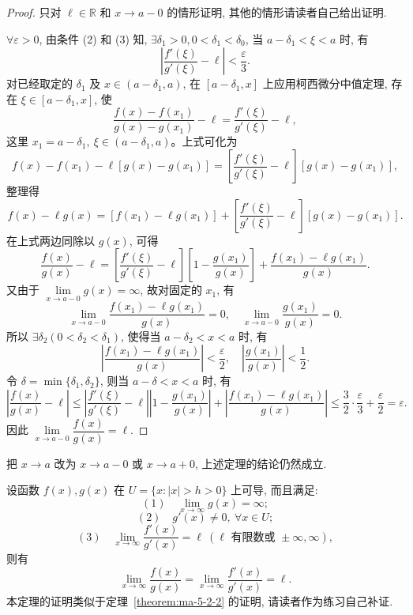\begin{proof}
只对 $\ell\in\mathbb{R}$ 和 $x\to a-0$ 的情形证明, 其他的情形请读者自己给出证明.

$\forall\varepsilon>0$, 由条件 (2) 和 (3) 知, $\exists\delta_1>0,0<\delta_1<\delta_0$, 当 $a-\delta_1<\xi<a$ 时, 有
\[
  \left|\frac{f'(\xi)}{g'(\xi)}-\ell\right|<\frac\varepsilon3.
\]
对已经取定的 $\delta_1$ 及 $x\in(a-\delta_1,a)$, 在 $[a-\delta_1,x]$ 上应用柯西微分中值定理, 存在 $\xi\in[a-\delta_1,x]$, 使
\[
  \frac{f(x)-f(x_1)}{g(x)-g(x_1)}-\ell
  =
  \frac{f'(\xi)}{g'(\xi)}-\ell,
\]
这里 $x_1=a-\delta_1,\ \xi\in(a-\delta_1,a)$。上式可化为
\[
  f(x)-f(x_1)-\ell[g(x)-g(x_1)]
  =
  \left[\frac{f'(\xi)}{g'(\xi)}-\ell\right][g(x)-g(x_1)],
\]
整理得
\[
  f(x)-\ell g(x)
  =
  [f(x_1)-\ell g(x_1)]
  +
  \left[\frac{f'(\xi)}{g'(\xi)}-\ell\right][g(x)-g(x_1)].
\]
在上式两边同除以 $g(x)$, 可得
\[
  \frac{f(x)}{g(x)}-\ell
  =
  \left[\frac{f'(\xi)}{g'(\xi)}-\ell\right]\left[1-\frac{g(x_1)}{g(x)}\right]
  +
  \frac{f(x_1)-\ell g(x_1)}{g(x)}.
\]
又由于 $\lim\limits_{x\to a-0}g(x)=\infty$, 故对固定的 $x_1$, 有
\[
  \lim_{x\to a-0}\frac{f(x_1)-\ell g(x_1)}{g(x)}=0,\quad
  \lim_{x\to a-0}\frac{g(x_1)}{g(x)}=0.
\]
所以 $\exists\delta_2(0<\delta_2<\delta_1)$, 使得当 $a-\delta_2<x<a$ 时, 有
\[
  \left|\frac{f(x_1)-\ell g(x_1)}{g(x)}\right|<\frac\varepsilon2,\quad
  \left|\frac{g(x_1)}{g(x)}\right|<\frac12.
\]
令 $\delta=\min\{\delta_1,\delta_2\}$, 则当 $a-\delta<x<a$ 时, 有
\[
  \left|\frac{f(x)}{g(x)}-\ell\right|
  \leqslant
  \left|\frac{f'(\xi)}{g'(\xi)}-\ell\right|
  \left|1-\frac{g(x_1)}{g(x)}\right|
  +
  \left|\frac{f(x_1)-\ell g(x_1)}{g(x)}\right|
  \leqslant
  \frac32\cdot\frac\varepsilon3+\frac\varepsilon2
  =
  \varepsilon.
\]
因此 $\lim\limits_{x\to a-0}\dfrac{f(x)}{g(x)}=\ell$.
\end{proof}


\begin{remark}\label{remark:ma-5-source-46}
把 $x\to a$ 改为 $x\to a-0$ 或 $x\to a+0$, 上述定理的结论仍然成立.
\end{remark}


\begin{theorem}\label{theorem:ma-5-2-4}
设函数 $f(x),g(x)$ 在 $U=\{x: |x|>h>0\}$ 上可导, 而且满足:
\[
  (1)\quad \lim_{x\to\infty}g(x)=\infty;
\]
\[
  (2)\quad g'(x)\ne0,\ \forall x\in U;
\]
\[
  (3)\quad \lim_{x\to\infty}\frac{f'(x)}{g'(x)}=\ell\ (\ell\text{ 有限数或 }\pm\infty,\infty),
\]
则有
\[
  \lim_{x\to\infty}\frac{f(x)}{g(x)}
  =
  \lim_{x\to\infty}\frac{f'(x)}{g'(x)}
  =
  \ell.
\]
本定理的证明类似于定理~\ref{theorem:ma-5-2-2} 的证明, 请读者作为练习自己补证.
\end{theorem}


